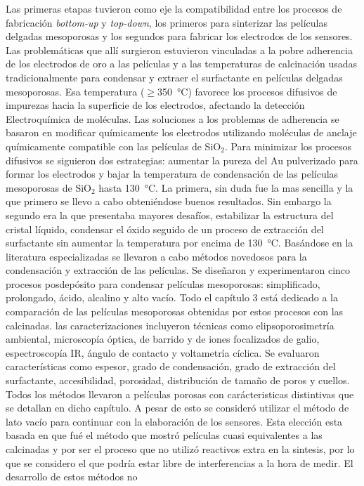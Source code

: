 Las primeras etapas tuvieron como eje la compatibilidad entre los procesos de fabricación \textit{bottom-up} y \textit{top-down}, los primeros para sinterizar las películas delgadas mesoporosas y los segundos para fabricar los electrodos de los sensores. Las problemáticas que allí surgieron estuvieron vinculadas a la pobre adherencia de los electrodos de oro a las películas y a las temperaturas de calcinación usadas tradicionalmente para condensar y extraer el surfactante en películas delgadas mesoporosas. Esa temperatura ($\geq$\SI{350}{\celsius}) favorece los procesos difusivos de impurezas hacia la superficie de los electrodos, afectando la detección Electroquímica de moléculas. Las soluciones a los problemas de adherencia se basaron en modificar químicamente los electrodos utilizando moléculas de anclaje químicamente compatible con las películas de SiO$_2$. Para minimizar los procesos difusivos se siguieron dos estrategias: aumentar la pureza del Au pulverizado para formar los electrodos y bajar la temperatura de condensación de las películas mesoporosas de SiO$_2$ hasta \SI{130}{\celsius}. La primera, sin duda fue la mas sencilla y la que primero se llevo a cabo obteniéndose buenos resultados. Sin embargo la segundo era la que presentaba mayores desafíos, estabilizar la estructura del cristal líquido, condensar el óxido seguido de un proceso de extracción del surfactante sin aumentar la temperatura por encima de \SI{130}{\celsius}. Basándose en la literatura especializadas se llevaron a cabo métodos novedosos para la condensación y extracción de las películas. Se diseñaron y experimentaron cinco procesos posdepósito para condensar películas mesoporosas: simplificado, prolongado, ácido, alcalino y alto vacío. Todo el capítulo 3 está dedicado a la comparación de las películas mesoporosas obtenidas por estos procesos con las calcinadas. las caracterizaciones incluyeron técnicas como elipsoporosimetría ambiental, microscopía óptica, de barrido y de iones focalizados de galio, espectroscopía IR, ángulo de contacto y voltametría cíclica. Se evaluaron características como espesor, grado de condensación, grado de extracción del surfactante, accesibilidad, porosidad, distribución de tamaño de poros y cuellos. Todos los métodos llevaron a películas porosas con carácteristicas distintivas que se detallan en dicho capítulo. A pesar de esto se consideró utilizar el método de lato vacío para continuar con la elaboración de los sensores. Esta elección esta basada en que fué el método que mostró películas cuasi equivalentes a las calcinadas y por ser el proceso que no utilizó reactivos extra en la sintesis, por lo que se considero el que podría estar libre de interferencias a la hora de medir. El desarrollo de estos métodos no 